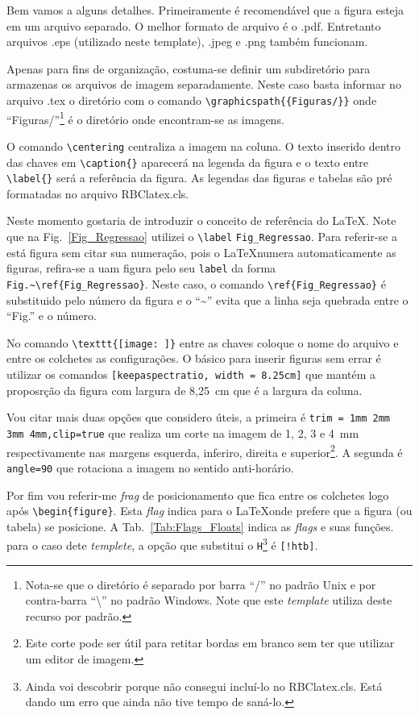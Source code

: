 \documentclass{RBClatex}
\begin{document}
Bem vamos a alguns detalhes. Primeiramente é recomendável que a figura esteja em um arquivo separado. O melhor formato de arquivo é o .pdf. Entretanto arquivos .eps (utilizado neste template), .jpeg e .png também funcionam. 

Apenas para fins de organização, costuma-se definir um subdiretório para armazenas os arquivos de imagem separadamente. Neste caso basta informar no arquivo .tex o diretório com o comando \verb|\graphicspath{{Figuras/}}| onde ``Figuras/''\footnote{Nota-se que o diretório é separado por barra ``/'' no padrão Unix e por contra-barra ``\textbackslash'' no padrão Windows. Note que este \textit{template} utiliza deste recurso por padrão.} é o diretório onde encontram-se as imagens.

O comando \verb|\centering| centraliza a imagem na coluna. O texto inserido dentro das chaves em \verb|\caption{}| aparecerá na legenda da figura e o texto entre \verb|\label{}| será a referência da figura. As legendas das figuras e tabelas são pré formatadas no arquivo RBClatex.cls.

Neste momento gostaria de introduzir o conceito de referência do \LaTeX. Note que na Fig.~\ref{Fig_Regressao} utilizei o \verb|\label| \verb|Fig_Regressao|. Para referir-se a está figura sem citar sua numeração, pois o \LaTeX numera automaticamente as figuras, refira-se a uam figura pelo seu \verb|label| da forma \verb|Fig.~\ref{Fig_Regressao}|. Neste caso, o comando \verb|\ref{Fig_Regressao}| é substituido pelo número da figura e o ``\textasciitilde{}'' evita que a linha seja quebrada entre o ``Fig.'' e o número.

No comando \verb|\texttt{[image: ]}| entre as chaves coloque o nome do arquivo e entre os colchetes as configurações. O básico para inserir figuras sem errar é utilizar os comandos \verb|[keepaspectratio, width = 8.25cm]| que mantém a proposrção da figura com largura de 8,25~cm que é a largura da coluna.

Vou citar mais duas opções que considero úteis, a primeira é \verb|trim = 1mm 2mm 3mm 4mm,clip=true| que realiza um corte na imagem de 1, 2, 3 e 4~mm respectivamente nas margens esquerda, inferiro, direita e superior\footnote{Este corte pode ser útil para retitar bordas em branco sem ter que utilizar um editor de imagem.}. A segunda é \verb|angle=90| que rotaciona a imagem no sentido anti-horário.

Por fim vou referir-me \textit{frag} de posicionamento que fica entre os colchetes logo após \verb|\begin{figure}|. Esta \textit{flag} indica para o \LaTeX onde prefere que a figura (ou tabela) se posicione. A Tab.~\ref{Tab:Flags_Floats} indica as \textit{flags} e suas funções. para o caso dete \textit{templete}, a opção que substitui o \verb|H|\footnote{Ainda voi descobrir porque não consegui incluí-lo no RBClatex.cls. Está dando um erro que ainda não tive tempo de saná-lo.} é \verb|[!htb]|.
\end{document}
